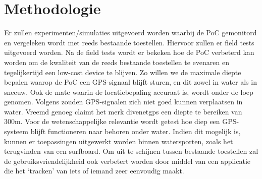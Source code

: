 \section{Methodologie}
\label{sec:methodologie}

Er zullen experimenten/simulaties uitgevoerd worden waarbij de PoC gemonitord en vergeleken wordt met reeds bestaande toestellen. Hiervoor zullen er field tests uitgevoerd worden.  Na de field tests wordt er bekeken hoe de PoC verbeterd kan worden om de kwaliteit van de reeds bestaande toestellen te evenaren en tegelijkertijd een low-cost device te blijven. 
Zo willen we de maximale diepte bepalen waarop de PoC een GPS-signaal blijft sturen, en dit zowel in water als in sneeuw. Ook de mate waarin de locatiebepaling accuraat is, wordt onder de loep genomen. 
Volgens \autocite{gps_water} zouden GPS-signalen zich niet goed kunnen verplaatsen in water. Vreemd genoeg claimt het merk divenetgps een diepte te bereiken van 300m. Voor de wetenschappelijke relevantie wordt getest hoe diep een GPS-systeem blijft functioneren naar behoren onder water. Indien dit mogelijk is, kunnen er toepassingen uitgewerkt worden binnen watersporten, zoals het terugvinden van een surfboard.
Om uit te schijnen tussen bestaande toestellen zal de gebruiksvriendelijkheid ook verbetert worden door middel van een applicatie die het ‘tracken’ van iets of iemand zeer eenvoudig maakt.



